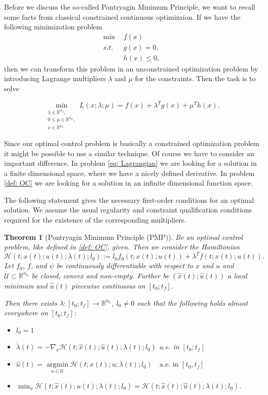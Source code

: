 \documentclass[a4paper]{article}
\theoremstyle{definitions}
\theoremstyle{bemerkung}
\theoremstyle{satz}
\newtheorem{satz}[defi]{Theorem}
\theoremstyle{satz}
\begin{document}
Before we discuss the so-called Pontryagin Minimum Principle, we want to recall some facts from classical constrained continuous optimizaion.
If we have the following minimization problem
\begin{align*}
    \min &f(x)\\
    s.t.\text{ } & g(x) = 0,\\
    & h(x) \leq 0,
\end{align*}
then we can transform this problem in an unconstrained optimization problem by introducing Lagrange multipliers $\lambda$ and $\mu$ for the constraints. Then the task is to solve

\begin{equation}
    \label{eq: Lagrangian}
    \min_{\substack{\lambda \in \mathbb{R}^{n_\lambda},\\ 0\leq \mu\in \mathbb{R}^{n_\mu},\\ x\in \mathbb{R}^{n_x}}} L(x; \lambda;\mu)= f(x) + \lambda^T g(x)+\mu^T h(x).
\end{equation}

Since our optimal control problem is basically a constrained optimization problem it might be possible to use a similar technique. Of course we have to consider an important difference. In problem \ref{eq: Lagrangian} we are looking for a solution in a finite dimensional space, where we have a nicely defined derivative. In problem \ref{def: OC} we are looking for a solution in an infinite dimensional function space.

The following statement gives the necessary first-order conditions for an optimal solution. We assume the usual regularity and constraint qualification conditions required for the existence of the corresponding multipliers. 

\begin{satz}[Pontryagin Minimum Principle (PMP)]
    Be an optimal control problem, like defined in \ref{def: OC}, given. Then we consider the Hamiltonian
    \[
        \mathcal{H}(t;x(t);u(t);\lambda(t); l_0):=l_0f_0(t;x(t);u(t))+\lambda^T f(t;x(t);u(t)).
    \]
    Let $f_0$, $f$, and $\psi$ be continuously differentiable with respect to $x$ and $u$ and $\mathcal{U}\subset \mathbb{R}^{n_u}$ be closed, convex and non-empty. Further be $(\hat{x}(t); \hat{u}(t))$ a local minimum and $\hat{u}(t)$ piecewise continuous on $[t_0;t_f]$.

    Then there exists $\lambda: [t_0;t_f] \to \mathbb{R}^{n_x}$, $l_0 \neq 0$ such that the following holds almost everywhere on $[t_0; t_f]$:
    \begin{itemize}
        \item $l_0 = 1$
        \item $\dot{\lambda}(t) = - \nabla_x \mathcal{H}(t;\hat{x}(t); \hat{u}(t); \lambda(t); l_0)$ a.e. in $[t_0;t_f]$
        \item $\hat{u}(t) = \operatorname*{argmin}\limits_{u\in \mathcal{U}} \mathcal{H}(t;x(t);u; \lambda(t);l_0) \quad \text{a.e. in }[t_0,t_f]$
        \item $\min_{u} \mathcal{H}(t;\hat{x}(t);u(t);\lambda(t);l_0) = \mathcal{H}(t;\hat{x}(t); \hat{u}(t);\lambda(t);l_0)$.
    \end{itemize}
\end{satz}
 
\end{document}
